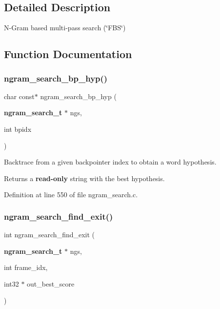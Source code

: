 \subsection{Detailed Description}
N-\/\+Gram based multi-\/pass search (\char`\"{}\+F\+B\+S\char`\"{}) 



\subsection{Function Documentation}
\mbox{\label{ngram__search_8c_aee393a136f8f7e8b98161e6eed7b1dd9}} 
\subsubsection{ngram\+\_\+search\+\_\+bp\+\_\+hyp()}
{\footnotesize\ttfamily char const$\ast$ ngram\+\_\+search\+\_\+bp\+\_\+hyp (\begin{DoxyParamCaption}\item[{\textbf{ ngram\+\_\+search\+\_\+t} $\ast$}]{ngs,  }\item[{int}]{bpidx }\end{DoxyParamCaption})}



Backtrace from a given backpointer index to obtain a word hypothesis. 

\begin{DoxyReturn}{Returns}
a {\bfseries read-\/only} string with the best hypothesis. 
\end{DoxyReturn}


Definition at line 550 of file ngram\+\_\+search.\+c.

\mbox{\label{ngram__search_8c_aa4b308f06bdf75b2f5eb0f0559f775ae}} 
\subsubsection{ngram\+\_\+search\+\_\+find\+\_\+exit()}
{\footnotesize\ttfamily int ngram\+\_\+search\+\_\+find\+\_\+exit (\begin{DoxyParamCaption}\item[{\textbf{ ngram\+\_\+search\+\_\+t} $\ast$}]{ngs,  }\item[{int}]{frame\+\_\+idx,  }\item[{int32 $\ast$}]{out\+\_\+best\+\_\+score }\end{DoxyParamCaption})}



